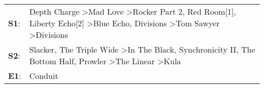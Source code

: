 \begin{supertabular}{p{0.03\textwidth}p{0.92\textwidth}}
 \textbf{S1}:  &  Depth Charge\textsuperscript{} \textgreater \enspace Mad Love\textsuperscript{} \textgreater \enspace Rocker Part 2\textsuperscript{}, \enspace Red Room[1]\textsuperscript{}, \enspace Liberty Echo[2]\textsuperscript{} \textgreater \enspace Blue Echo\textsuperscript{}, \enspace Divisions\textsuperscript{} \textgreater \enspace Tom Sawyer\textsuperscript{} \textgreater \enspace Divisions\textsuperscript{}  \enspace  \\
 \textbf{S2}:  &                                                                 Slacker\textsuperscript{}, \enspace The Triple Wide\textsuperscript{} \textgreater \enspace In The Black\textsuperscript{}, \enspace Synchronicity II\textsuperscript{}, \enspace The Bottom Half\textsuperscript{}, \enspace Prowler\textsuperscript{} \textgreater \enspace The Linear\textsuperscript{} \textgreater \enspace Kula\textsuperscript{}  \enspace  \\
 \textbf{E1}:  &                                                                                                                                                                                                                                                                                                                                                                                               Conduit\textsuperscript{}  \enspace  \\
\end{supertabular}
